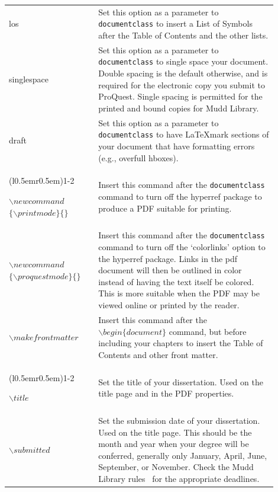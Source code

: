 \begin{longtable}{p{0.3\linewidth} p{0.6\linewidth}}
  los &
  Set this option as a parameter to \texttt{documentclass} to insert a List of Symbols after the Table of Contents and the other lists.
  \\

  singlespace &
  Set this option as a parameter to \texttt{documentclass} to single space your document. Double spacing is the default otherwise, and is required for the electronic copy you submit to ProQuest. Single spacing is permitted for the printed and bound copies for Mudd Library.
  \\
  
  draft &
  Set this option as a parameter to \texttt{documentclass} to have \LaTeX mark sections of your document that have formatting errors (e.g., overfull hboxes). 
  \\

  \cmidrule[0.1pt](l{0.5em}r{0.5em}){1-2}

  \raggedright
  $\backslash newcommand$ $\{\backslash printmode\}\{\}$ &
  Insert this command after the \texttt{documentclass} command to turn off the hyperref package to produce a PDF suitable for printing.
  \\

  \raggedright
  $\backslash newcommand$ $\{\backslash proquestmode\}\{\}$  &
  Insert this command after the \texttt{documentclass} command to turn off the `colorlinks' option to the hyperref package. Links in the pdf document will then be outlined in color instead of having the text itself be colored. This is more suitable when the PDF may be viewed online or printed by the reader.
  \\

  $\backslash makefrontmatter$ &
  Insert this command after the \texttt{$\backslash begin\{document\}$} command, but before including your chapters to insert the Table of Contents and other front matter.
  \\
  
  \cmidrule[0.1pt](l{0.5em}r{0.5em}){1-2}

  $\backslash title$ &
  Set the title of your dissertation. Used on the title page and in the PDF properties.
  \\

  $\backslash submitted$ &
  Set the submission date of your dissertation. Used on the title page. This should be the month and year when your degree will be conferred, generally only January, April, June, September, or November. Check the Mudd Library rules~\cite{mudd2009} for the appropriate deadlines.
  \\


\end{longtable}
